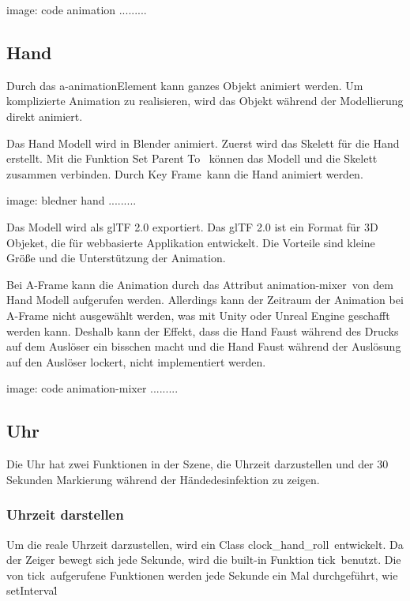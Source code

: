  image: code animation .........
 
 
 \subsection{Hand}
 
 Durch das \glqq a-animation\grqq Element kann ganzes Objekt animiert werden. Um komplizierte Animation zu realisieren, wird das Objekt während der Modellierung direkt animiert.
 
 Das Hand Modell wird in Blender animiert. Zuerst wird das Skelett für die Hand erstellt. Mit die Funktion \glqq Set Parent To \grqq\ können das Modell und die Skelett zusammen verbinden. Durch \glqq Key Frame\grqq\ kann die Hand animiert werden.
 
 image: bledner hand .........
 
 Das Modell wird als glTF 2.0 exportiert. Das glTF 2.0 ist ein Format für 3D Objeket, die für webbasierte Applikation entwickelt. Die Vorteile sind kleine Größe und die Unterstützung der Animation.
 
 Bei A-Frame kann die Animation durch das Attribut \glqq animation-mixer\grqq\ von dem Hand Modell aufgerufen werden. Allerdings kann der Zeitraum der Animation bei A-Frame nicht ausgewählt werden, was mit Unity oder Unreal Engine geschafft werden kann. Deshalb kann der Effekt, dass die Hand Faust während des Drucks auf dem Auslöser ein bisschen macht und die Hand Faust während der Auslösung auf den Auslöser lockert, nicht implementiert werden.
 
 image: code animation-mixer .........
 
 
 \subsection{Uhr}
 
 Die Uhr hat zwei Funktionen in der Szene, die Uhrzeit darzustellen und der 30 Sekunden Markierung während der Händedesinfektion zu zeigen.
 
 \subsubsection{Uhrzeit darstellen}
 Um die reale Uhrzeit darzustellen, wird ein Class \glqq clock\_hand\_roll\grqq\ entwickelt. Da der Zeiger bewegt sich jede Sekunde, wird die built-in Funktion \glqq tick\grqq\ benutzt. Die von \glqq tick\grqq\ aufgerufene Funktionen werden jede Sekunde ein Mal durchgeführt, wie \glqq setInterval\grqq\.
 
